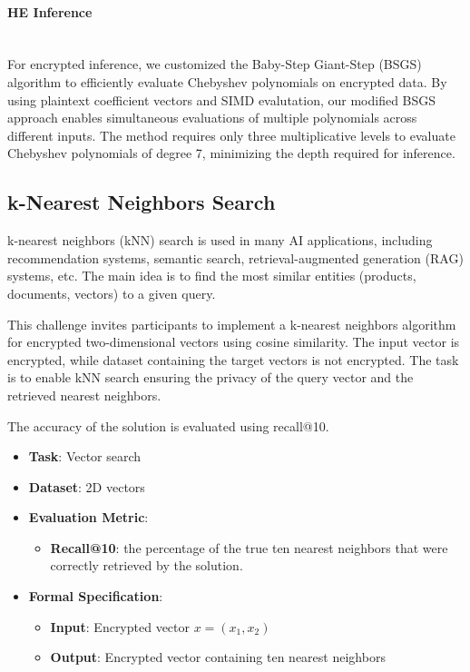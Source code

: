 \documentclass[article]{iacrtrans}
\begin{document}
\paragraph{HE Inference}\mbox{}\\

For encrypted inference, we customized the Baby-Step Giant-Step (BSGS) algorithm to efficiently evaluate Chebyshev polynomials on encrypted data. By using plaintext coefficient vectors and SIMD evalutation, our modified BSGS approach enables simultaneous evaluations of multiple polynomials across different inputs. The method requires only three multiplicative levels to evaluate Chebyshev polynomials of degree 7, minimizing the depth required for inference.

\subsection{k-Nearest Neighbors Search}
k-nearest neighbors (kNN) search is used in many AI applications, including recommendation systems, semantic search, retrieval-augmented generation (RAG) systems, etc. The main idea is to find the most similar entities (products, documents, vectors) to a given query. 

This challenge invites participants to implement a k-nearest neighbors algorithm for encrypted two-dimensional vectors using cosine similarity. The input vector is encrypted, while dataset containing the target vectors is not encrypted. The task is to enable kNN search ensuring the privacy of the query vector and the retrieved nearest neighbors.

The accuracy of the solution is evaluated using  recall@10.


\begin{itemize}
    \item \textbf{Task}: Vector search
    \item \textbf{Dataset}: 2D vectors
    \item \textbf{Evaluation Metric}:
        \begin{itemize}
            \item \textbf{Recall@10}: the percentage of the true ten nearest neighbors that were correctly retrieved by the solution. 
        \end{itemize}
    \item \textbf{Formal Specification}: 
        \begin{itemize}
            \item \textbf{Input}: Encrypted vector $x = (x_1, x_{2})$
            \item \textbf{Output}: Encrypted vector containing ten nearest neighbors 
        \end{itemize}
\end{itemize}
\end{document}
